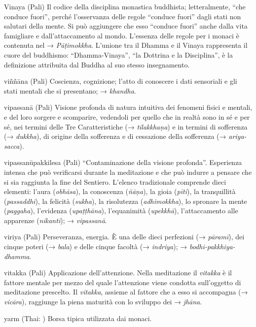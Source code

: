 \begin{glossarydescription}
\item[Vinaya] (Pali) Il codice della disciplina monastica buddhista; letteralmente,
``che conduce fuori'', perché l'osservanza delle regole ``conduce
fuori'' dagli stati non salutari della mente. Si può aggiungere che esso
``conduce fuori'' anche dalla vita famigliare e dall'attaccamento al
mondo. L'essenza delle regole per i monaci è contenuta nel →
\emph{Pāṭimokkha}. L'unione tra il Dhamma e il Vinaya rappresenta il
cuore del buddhismo: ``Dhamma-Vinaya'', ``la Dottrina e la Disciplina'',
è la definizione attribuita dal Buddha al suo stesso insegnamento.

\item[viññāna] (Pali) Coscienza, cognizione; l'atto di conoscere i dati
sensoriali e gli stati mentali che si presentano; → \emph{khandha}.

\item[vipassanā] (Pali) Visione profonda di natura intuitiva dei fenomeni
fisici e mentali, e del loro sorgere e scomparire, vedendoli per quello
che in realtà sono in sé e per sé, nei termini delle Tre Caratteristiche
(→ \emph{tilakkhaṇa}) e in termini di sofferenza (→ \emph{dukkha}), di
origine della sofferenza e di cessazione della sofferenza (→
\emph{ariya-sacca}).

\item[vipassanūpakkilesa] (Pali) ``Contaminazione della visione profonda''.
Esperienza intensa che può verificarsi durante la meditazione e che può
indurre a pensare che si sia raggiunta la fine del Sentiero. L'elenco
tradizionale comprende dieci elementi: l'aura (\emph{obhāsa}), la
conoscenza (\emph{ñāṇa}), la gioia (\emph{pīti}), la tranquillità
(\emph{passaddhi}), la felicità (\emph{sukha}), la risolutezza
(\emph{adhimokkha}), lo spronare la mente (\emph{paggaha}), l'evidenza
(\emph{upaṭṭhāna}), l'equanimità (\emph{upekkhā}), l'attaccamento alle
apparenze (\emph{nikanti}); → \emph{vipassanā}.

\item[viriya] (Pali) Perseveranza, energia. È una delle dieci perfezioni (→
\emph{pāramī}), dei cinque poteri (→ \emph{bala}) e delle cinque facoltà
(→ \emph{indriya}); → \emph{bodhi-pakkhiya-dhamma}.

\item[vitakka] (Pali) Applicazione dell'attenzione. Nella meditazione il
\emph{vitakka} è il fattore mentale per mezzo del quale l'attenzione
viene condotta sull'oggetto di meditazione prescelto. Il \emph{vitakka},
assieme al fattore che a esso si accompagna (→ \emph{vicāra}), raggiunge
la piena maturità con lo sviluppo dei → \emph{jhāna}.



\item[yarm] (Thai: ) Borsa tipica utilizzata dai monaci.

\end{glossarydescription}

